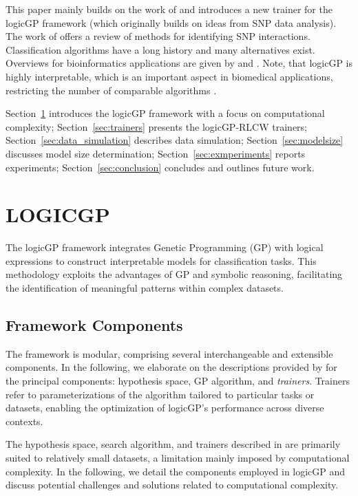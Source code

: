 \documentclass[a4paper,twoside]{article}
\begin{document}
This paper mainly builds on the work of \citet{10.1145/3712255.3734300} and introduces a new trainer for the logicGP framework (which originally builds on ideas from SNP data analysis). The work of \citet{5728791} offers a review of methods for identifying SNP interactions. Classification algorithms have a long history and many alternatives exist. Overviews for bioinformatics applications are given by \citet{Alam2024} and \citet{OBRIEN2025323}. Note, that logicGP is highly interpretable, which is an important aspect in biomedical applications, restricting the number of comparable algorithms \citep{bioinformatics25}.

Section~\ref{sec:logicgp} introduces the logicGP framework with a focus on computational complexity; Section~\ref{sec:trainers} presents the logicGP-RLCW trainers; Section~\ref{sec:data_simulation} describes data simulation; Section~\ref{sec:modelsize} discusses model size determination; Section~\ref{sec:exmperiments} reports experiments; Section~\ref{sec:conclusion} concludes and outlines future work.

\section{\uppercase{logicGP}}\label{sec:logicgp}

The logicGP framework integrates Genetic Programming (GP) with logical expressions to construct interpretable models for classification tasks. This methodology exploits the advantages of GP and symbolic reasoning, facilitating the identification of meaningful patterns within complex datasets.

\subsection{Framework Components}

The framework is modular, comprising several interchangeable and extensible components. In the following, we elaborate on the descriptions provided by \citet{10.1145/3712255.3734300} for the principal components: hypothesis space, GP algorithm, and \emph{trainers}. Trainers refer to parameterizations of the algorithm tailored to particular tasks or datasets, enabling the optimization of logicGP’s performance across diverse contexts.

The hypothesis space, search algorithm, and trainers described in \citet{10.1145/3712255.3734300} are primarily suited to relatively small datasets, a limitation mainly imposed by computational complexity. In the following, we detail the components employed in logicGP and discuss potential challenges and solutions related to computational complexity. 
\end{document}
